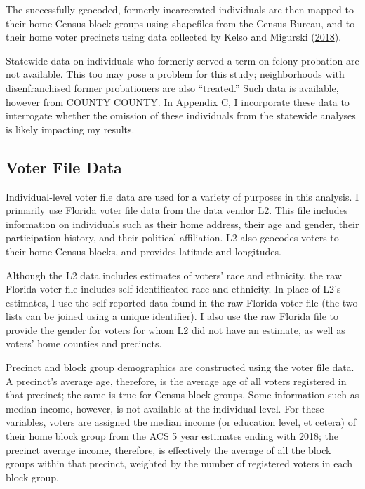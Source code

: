 \documentclass[
  12pt,
]{article}
\begin{document}
The successfully geocoded, formerly incarcerated individuals are then mapped to their home Census block groups using shapefiles from the Census Bureau, and to their home voter precincts using data collected by Kelso and Migurski (\protect\hyperlink{ref-Kelso2018}{2018}).

Statewide data on individuals who formerly served a term on felony probation are not available. This too may pose a problem for this study; neighborhoods with disenfranchised former probationers are also ``treated.'' Such data is available, however from COUNTY COUNTY. In Appendix C, I incorporate these data to interrogate whether the omission of these individuals from the statewide analyses is likely impacting my results.

\hypertarget{voter-file-data}{%
\subsection*{Voter File Data}\label{voter-file-data}}

Individual-level voter file data are used for a variety of purposes in this analysis. I primarily use Florida voter file data from the data vendor L2. This file includes information on individuals such as their home address, their age and gender, their participation history, and their political affiliation. L2 also geocodes voters to their home Census blocks, and provides latitude and longitudes.

Although the L2 data includes estimates of voters' race and ethnicity, the raw Florida voter file includes self-identificated race and ethnicity. In place of L2's estimates, I use the self-reported data found in the raw Florida voter file (the two lists can be joined using a unique identifier). I also use the raw Florida file to provide the gender for voters for whom L2 did not have an estimate, as well as voters' home counties and precincts.

Precinct and block group demographics are constructed using the voter file data. A precinct's average age, therefore, is the average age of all voters registered in that precinct; the same is true for Census block groups. Some information such as median income, however, is not available at the individual level. For these variables, voters are assigned the median income (or education level, et cetera) of their home block group from the ACS 5 year estimates ending with 2018; the precinct average income, therefore, is effectively the average of all the block groups within that precinct, weighted by the number of registered voters in each block group.
\end{document}
